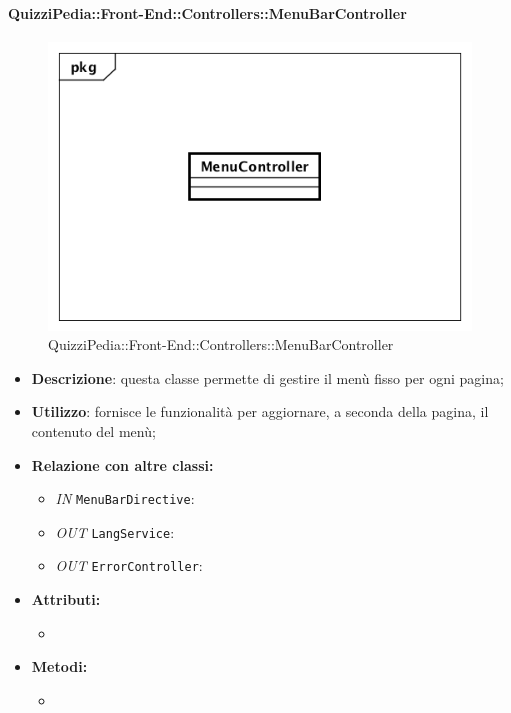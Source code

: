 \paragraph{QuizziPedia::Front-End::Controllers::MenuBarController}
\begin{figure}
	\centering
	\includegraphics[scale=0.45]{UML/Classi/Front-End/QuizziPedia_Front-end_Controller_MenuBarController.png}
	\caption{QuizziPedia::Front-End::Controllers::MenuBarController}
\end{figure}
\begin{itemize}
	\item \textbf{Descrizione}: questa classe permette di gestire il menù fisso per ogni pagina;
	\item \textbf{Utilizzo}: fornisce le funzionalità per aggiornare, a seconda della pagina, il contenuto del menù;
	\item \textbf{Relazione con altre classi:}
	\begin{itemize}
		\item \textit{IN} \texttt{MenuBarDirective}:  
		\item \textit{OUT} \texttt{LangService}: 
		\item \textit{OUT} \texttt{ErrorController}: 
	\end{itemize}
	\item \textbf{Attributi:}
	\begin{itemize}
		\item 
	\end{itemize}
	\item \textbf{Metodi:}
	\begin{itemize}
		\item 
	\end{itemize}
\end{itemize}

